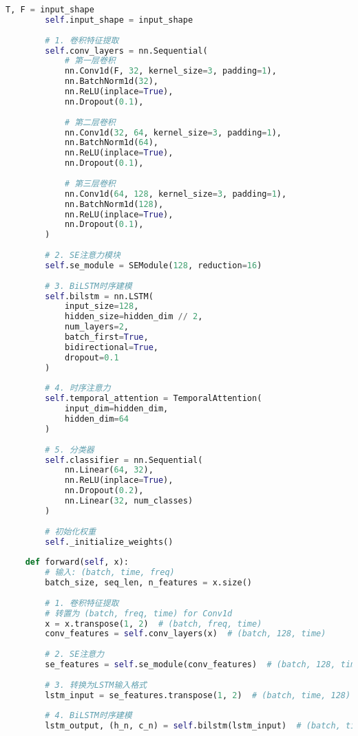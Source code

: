 \begin{lstlisting}[language=Python,caption=Enhanced模型完整实现]
        T, F = input_shape
        self.input_shape = input_shape
        
        # 1. 卷积特征提取
        self.conv_layers = nn.Sequential(
            # 第一层卷积
            nn.Conv1d(F, 32, kernel_size=3, padding=1),
            nn.BatchNorm1d(32),
            nn.ReLU(inplace=True),
            nn.Dropout(0.1),
            
            # 第二层卷积
            nn.Conv1d(32, 64, kernel_size=3, padding=1),
            nn.BatchNorm1d(64),
            nn.ReLU(inplace=True),
            nn.Dropout(0.1),
            
            # 第三层卷积
            nn.Conv1d(64, 128, kernel_size=3, padding=1),
            nn.BatchNorm1d(128),
            nn.ReLU(inplace=True),
            nn.Dropout(0.1),
        )
        
        # 2. SE注意力模块
        self.se_module = SEModule(128, reduction=16)
        
        # 3. BiLSTM时序建模
        self.bilstm = nn.LSTM(
            input_size=128,
            hidden_size=hidden_dim // 2,
            num_layers=2,
            batch_first=True,
            bidirectional=True,
            dropout=0.1
        )
        
        # 4. 时序注意力
        self.temporal_attention = TemporalAttention(
            input_dim=hidden_dim,
            hidden_dim=64
        )
        
        # 5. 分类器
        self.classifier = nn.Sequential(
            nn.Linear(64, 32),
            nn.ReLU(inplace=True),
            nn.Dropout(0.2),
            nn.Linear(32, num_classes)
        )
        
        # 初始化权重
        self._initialize_weights()
    
    def forward(self, x):
        # 输入: (batch, time, freq)
        batch_size, seq_len, n_features = x.size()
        
        # 1. 卷积特征提取
        # 转置为 (batch, freq, time) for Conv1d
        x = x.transpose(1, 2)  # (batch, freq, time)
        conv_features = self.conv_layers(x)  # (batch, 128, time)
        
        # 2. SE注意力
        se_features = self.se_module(conv_features)  # (batch, 128, time)
        
        # 3. 转换为LSTM输入格式
        lstm_input = se_features.transpose(1, 2)  # (batch, time, 128)
        
        # 4. BiLSTM时序建模
        lstm_output, (h_n, c_n) = self.bilstm(lstm_input)  # (batch, time, hidden_dim)
        

\end{lstlisting}
